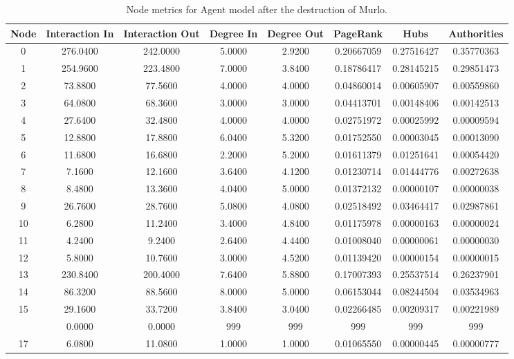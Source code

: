 \documentclass[12pt,a4paper]{thesis}
\begin{document}
\begin{table}[H]
\centering
\caption{Node metrics for Agent model after the destruction of Murlo.}
\tiny
\begin{tabular}{|c|c|c|c|c|c|c|c|}
\hline	Node	&	Interaction In	&	Interaction Out	&	Degree In	&	Degree Out	&	PageRank	&	Hubs	&	Authorities	\\
\hline	0	&	276.0400	&	242.0000	&	5.0000	&	2.9200 &	0.20667059	&	0.27516427	&	0.35770363	\\
\hline	1	&	254.9600	&	223.4800	&	7.0000	&	3.8400	&	0.18786417	&	0.28145215	&	0.29851473	\\
\hline	2	&	73.8800	&	77.5600	&	4.0000	&	4.0000	&	0.04860014	&	0.00605907	&	0.00559860	\\
\hline	3	&	64.0800	&	68.3600	&	3.0000	&	3.0000	&	0.04413701	&	0.00148406	&	0.00142513	\\
\hline	4	&	27.6400	&	32.4800	&	4.0000	&	4.0000	&	0.02751972	&	0.00025992	&	0.00009594	\\
\hline	5	&	12.8800	&	17.8800	&	6.0400	&	5.3200	&	0.01752550	&	0.00003045	&	0.00013090	\\
\hline	6	&	11.6800	&	16.6800	&	2.2000	&	5.2000	&	0.01611379	&	0.01251641	&	0.00054420	\\
\hline	7	&	7.1600	&	12.1600	&	3.6400	&	4.1200	&	0.01230714	&	0.01444776	&	0.00272638	\\
\hline	8	&	8.4800	&	13.3600	&	4.0400	&	5.0000	&	0.01372132	&	0.00000107	&	0.00000038	\\
\hline	9	&	26.7600	&	28.7600	&	5.0800	&	4.0800	&	0.02518492	&	0.03464417	&	0.02987861	\\
\hline	10	&	6.2800	&	11.2400	&	3.4000	&	4.8400	&	0.01175978	&	0.00000163	&	0.00000024	\\
\hline	11	&	4.2400	&	9.2400	&	2.6400	&	4.4400	&	0.01008040	&	0.00000061	&	0.00000030	\\
\hline	12	&	5.8000	&	10.7600	&	3.0000	&	4.5200	&	0.01139420	&	0.00000154	&	0.00000015	\\
\hline	13	&	230.8400	&	200.4000	&	7.6400	&	5.8800	&	0.17007393	&	0.25537514	&	0.26237901	\\
\hline	14	&	86.3200	&	88.5600	&	8.0000	&	5.0000	&	0.06153044	&	0.08244504	&	0.03534963	\\
\hline	15	&	29.1600	&	33.7200	&	3.8400	&	3.0400	&	0.02266485	&	0.00209317	&	0.00221989	\\
\rowcolor{yellow}
\hline	16	&	0.0000	&	0.0000	&	999	&	999	&	999	&	999	&	999	\\
\hline	17	&	6.0800	&	11.0800	&	1.0000	&	1.0000	&	0.01065550	&	0.00000445	&	0.00000777	\\

\end{tabular}
\end{table}
\end{document}
